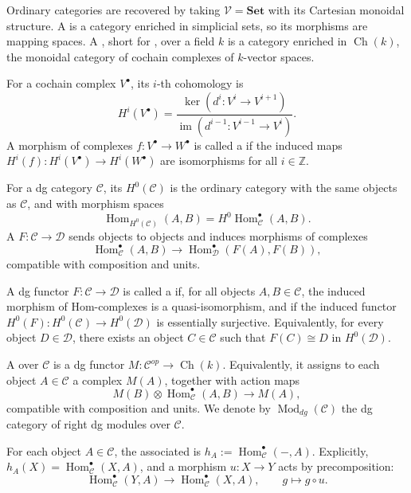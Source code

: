 {Ordinary categories are recovered by taking \(\mathcal V=\mathbf{Set}\)
with its Cartesian monoidal structure.  A 
is a category enriched in simplicial sets, so its morphisms are mapping
spaces.  A , short for , over a field \(k\) is a category enriched in
\(\operatorname{Ch}(k)\), the monoidal category of cochain complexes of
\(k\)-vector spaces.

For a cochain complex \(V^\bullet\), its \(i\)-th cohomology is
\[
H^i(V^\bullet)
=
\frac{\ker(d^i:V^i\to V^{i+1})}
{\operatorname{im}(d^{i-1}:V^{i-1}\to V^i)}.
\]
A morphism of complexes \(f:V^\bullet\to W^\bullet\) is called a
 if the induced maps
\(H^i(f):H^i(V^\bullet)\to H^i(W^\bullet)\) are isomorphisms for all
\(i\in\mathbb Z\).

For a dg category \(\mathcal C\), its 
\(H^0(\mathcal C)\) is the ordinary category with the same objects as
\(\mathcal C\), and with morphism spaces
\[
\operatorname{Hom}_{H^0(\mathcal C)}(A,B)
=
H^0\operatorname{Hom}_{\mathcal C}^{\bullet}(A,B).
\]
A  \(F:\mathcal C\to\mathcal D\) sends objects to
objects and induces morphisms of complexes
\[
\operatorname{Hom}_{\mathcal C}^{\bullet}(A,B)
\longrightarrow
\operatorname{Hom}_{\mathcal D}^{\bullet}(F(A),F(B)),
\]
compatible with composition and units.

A dg functor \(F:\mathcal C\to\mathcal D\) is called a
 if, for all objects \(A,B\in\mathcal C\), the
induced morphism of Hom-complexes is a quasi-isomorphism, and if the
induced functor \(H^0(F):H^0(\mathcal C)\to H^0(\mathcal D)\) is
essentially surjective.  Equivalently, for every object \(D\in\mathcal D\),
there exists an object \(C\in\mathcal C\) such that \(F(C)\cong D\) in
\(H^0(\mathcal D)\).

A  over \(\mathcal C\) is a dg functor
\(M:\mathcal C^{op}\to\operatorname{Ch}(k)\).  Equivalently, it assigns
to each object \(A\in\mathcal C\) a complex \(M(A)\), together with
action maps
\[
M(B)\otimes \operatorname{Hom}_{\mathcal C}^{\bullet}(A,B)
\longrightarrow M(A),
\]
compatible with composition and units.  We denote by
\(\operatorname{Mod}_{dg}(\mathcal C)\) the dg category of right dg
modules over \(\mathcal C\).

For each object \(A\in\mathcal C\), the associated  is
\(h_A:=\operatorname{Hom}_{\mathcal C}^{\bullet}(-,A)\).  Explicitly,
\(h_A(X)=\operatorname{Hom}_{\mathcal C}^{\bullet}(X,A)\), and a
morphism \(u:X\to Y\) acts by precomposition:
\[
\operatorname{Hom}_{\mathcal C}^{\bullet}(Y,A)
\longrightarrow
\operatorname{Hom}_{\mathcal C}^{\bullet}(X,A),
\qquad
g\longmapsto g\circ u.
\]

}
